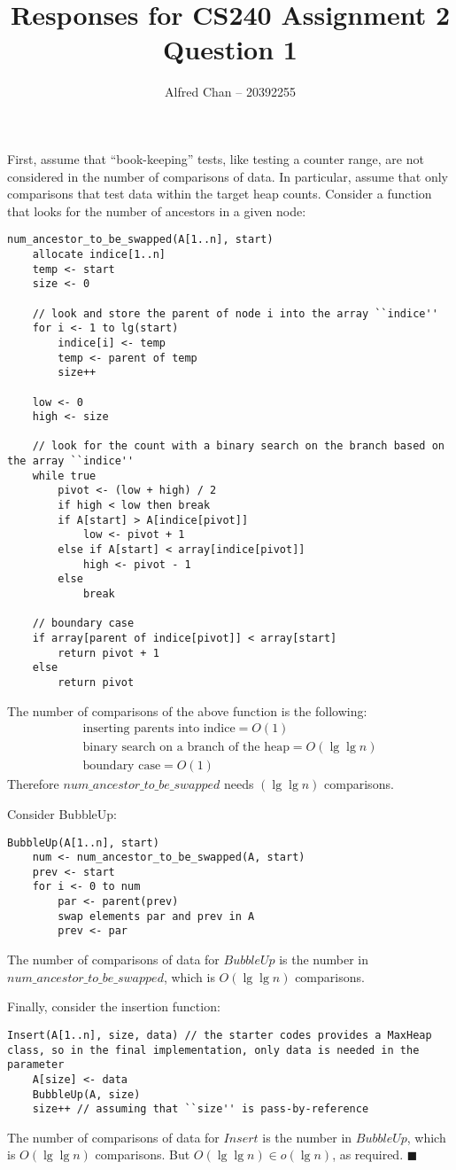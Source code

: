 \documentclass[12pt]{article}
\title{Responses for CS240 Assignment 2 Question 1}
\author{Alfred Chan -- 20392255}
\begin{document}
\lstset{
	language=c,
	numbers=left,
	showspaces=false,
	showstringspaces=false,
	stepnumber=1,
	basicstyle=\ttfamily,
	frame=single,
	breaklines=true,
	tabsize=2
}
\maketitle
First, assume that ``book-keeping'' tests, like testing a counter range, are not considered in the number of comparisons of data. In particular, assume that only comparisons that test data within the target heap counts.
Consider a function that looks for the number of ancestors in a given node:
\begin{lstlisting}
num_ancestor_to_be_swapped(A[1..n], start)
	allocate indice[1..n]
	temp <- start
	size <- 0

	// look and store the parent of node i into the array ``indice''
	for i <- 1 to lg(start)
		indice[i] <- temp
		temp <- parent of temp
		size++

	low <- 0
	high <- size

	// look for the count with a binary search on the branch based on the array ``indice''
	while true
		pivot <- (low + high) / 2
		if high < low then break
		if A[start] > A[indice[pivot]]
			low <- pivot + 1
		else if A[start] < array[indice[pivot]]
			high <- pivot - 1
		else
			break

	// boundary case
	if array[parent of indice[pivot]] < array[start]
		return pivot + 1
	else
		return pivot
\end{lstlisting}
The number of comparisons of the above function is the following:
\begin{align*}
\text{inserting parents into indice} = O(1)\\
\text{binary search on a branch of the heap} = O(\lg\lg n)\\
\text{boundary case} = O(1)
\end{align*}
Therefore $num\_ancestor\_to\_be\_swapped$ needs $(\lg\lg n)$ comparisons.

Consider BubbleUp:
\begin{lstlisting}
BubbleUp(A[1..n], start)
	num <- num_ancestor_to_be_swapped(A, start)
	prev <- start
	for i <- 0 to num
		par <- parent(prev)
		swap elements par and prev in A
		prev <- par
\end{lstlisting}
The number of comparisons of data for $BubbleUp$ is the number in $num\_ancestor\_to\_be\_swapped$, which is $O(\lg\lg n)$ comparisons.

Finally, consider the insertion function:
\begin{lstlisting}
Insert(A[1..n], size, data) // the starter codes provides a MaxHeap class, so in the final implementation, only data is needed in the parameter
	A[size] <- data
	BubbleUp(A, size)
	size++ // assuming that ``size'' is pass-by-reference
\end{lstlisting}
The number of comparisons of data for $Insert$ is the number in $BubbleUp$, which is $O(\lg\lg n)$ comparisons.
But $O(\lg\lg n) \in o(\lg n)$, as required.
\hfill $\blacksquare$
\end{document}
